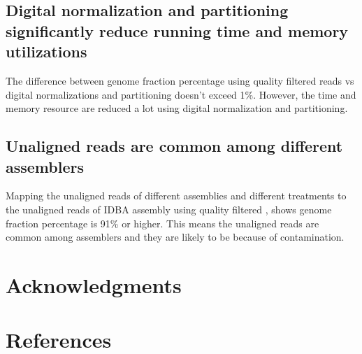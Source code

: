  \subsection*{Digital normalization and partitioning significantly reduce running time and memory utilizations}
 
 The difference between genome fraction percentage using quality filtered reads vs digital normalizations and partitioning doesn't exceed 1\%. However, the time and memory  resource are reduced a lot using digital normalization and partitioning. 
 
 
 \subsection*{Unaligned reads are common among different assemblers}
 Mapping the unaligned reads of different assemblies and different treatments to the unaligned reads of  IDBA  assembly using quality filtered , shows genome fraction percentage is 91\% or higher. This means the unaligned reads are common among assemblers and they are likely to be because of contamination. 



  

\section*{Acknowledgments}


\section*{References}

%
%
% 





